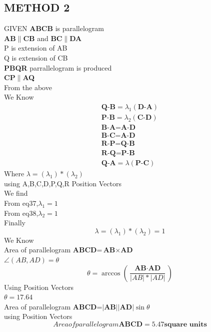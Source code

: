 \documentclass[journal,10pt,twocolumn]{article}
\begin{document}
      \subsection*{METHOD 2}
GIVEN \textbf{ABCB} is parallelogram\\
     \textbf{AB}$\parallel$\textbf{CB} and \textbf{BC}$\parallel$\textbf{DA}\\
     P is extension of AB \\
     Q is extension of CB \\
     \textbf{PBQR} parrallelogram is produced \\
     \textbf{CP}$\parallel$\textbf{AQ}\\
     From the above \\
     We Know
     \begin{eqnarray}
         \textbf{Q-B}=\lambda_1(\textbf{D-A})\\
     \textbf{P-B}=\lambda_2(\textbf{C-D})\\
     \textbf{B-A}=\textbf{A-D}\\
     \textbf{B-C}=\textbf{A-D}\\
     \textbf{R-P}=\textbf{Q-B}\\
     \textbf{R-Q}=\textbf{P-B}\\
      \textbf{Q-A}=\lambda(\textbf{P-C})
     \end{eqnarray}
     Where $\lambda=(\lambda_1)*(\lambda_2)$\\
     using A,B,C,D,P,Q,R Position Vectors\\
     We find\\
     From eq37,$\lambda_1=1$\\
     From eq38,$\lambda_2=1$\\
     Finally
     \begin{equation}
         \lambda=(\lambda_1)*(\lambda_2)=1
     \end{equation}
We Know \\
 Area of parallelogram \textbf{ABCD}=$\textbf{AB} \times \textbf{AD}$\\
 $\angle(AB,AD)=\theta$
 \begin{equation}
     \theta=\arccos(\frac{\textbf{AB}\cdot\textbf{AD}}{|AB|*|AD|})
 \end{equation}
 Using Position Vectors\\
$\theta=17.64$\\
 Area of parallelogram \textbf{ABCD}=$|\textbf{AB}||\textbf{AD}|\sin{\theta}$\\
 using Position Vectors
\begin{equation}
     Area of parallelogram \textbf{ABCD}=5.47 \textbf{square units}
\end{equation}
\end{document}
